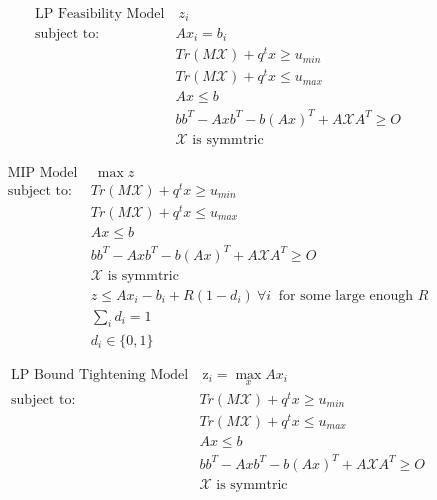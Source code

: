 \documentclass[11pt]{article}
\theoremstyle{plain}
\theoremstyle{definition}
\theoremstyle{remark}
\begin{document}
\begin{subequations}\label{eq:OPTfeasrelaxLP1}
\begin{align}
 \text{LP Feasibility Model}& \ z_i  \\
 \text{subject to: } \ &Ax_i= b_i \\
 &Tr\left(M\mathcal{X}\right)+q^tx \geq u_{min} \\
 & Tr\left(M\mathcal{X}\right)+q^tx \leq u_{max} \\
 	&Ax\leq b \\
 	&bb^T-Axb^T-b(Ax)^T+A\mathcal{X}A^T\geq O \\
 	&\mathcal{X} \text{ is symmtric}
\end{align}
\end{subequations}

\begin{subequations}\label{eq:OPTfeasrelaxLP2}
\begin{align}
 \text{MIP Model}& \ \max z  \\
 \text{subject to: } \ &Tr\left(M\mathcal{X}\right)+q^tx \geq u_{min} \\
 & Tr\left(M\mathcal{X}\right)+q^tx \leq u_{max} \\
 	&Ax\leq b \\
 	&bb^T-Axb^T-b(Ax)^T+A\mathcal{X}A^T\geq O \\
 	&\mathcal{X} \text{ is symmtric} \\
 	& z\leq Ax_i-b_i+R(1-d_i) \ \forall i \ \text{ for some large enough $R$} \\
 	& \sum\limits_i d_i=1 \\
 	& d_i\in\{0,1\}
\end{align}
\end{subequations}
 
\begin{subequations}\label{eq:OPTfeasrelaxLP3}
\begin{align}
\text{LP Bound Tightening Model}& \ \mathrm{z}_{i} = \max_x Ax_i  \\
 \text{subject to: } \ &Tr\left(M\mathcal{X}\right)+q^tx \geq u_{min} \\
 & Tr\left(M\mathcal{X}\right)+q^tx \leq u_{max} \\
 	&Ax\leq b \\
 	&bb^T-Axb^T-b(Ax)^T+A\mathcal{X}A^T\geq O \\
 	&\mathcal{X} \text{ is symmtric}
\end{align}
\end{subequations}
\end{document}
